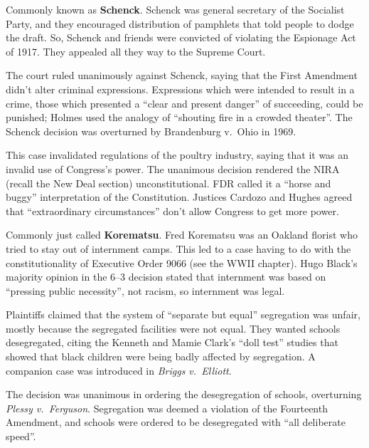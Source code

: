 Commonly known as \textbf{Schenck}.
Schenck was general secretary of the Socialist Party,
and they encouraged distribution of pamphlets that told people to dodge the draft.
So, Schenck and friends were convicted of violating the Espionage Act of 1917.
They appealed all they way to the Supreme Court.

The court ruled unanimously against Schenck, saying that the First Amendment didn't alter criminal expressions.
Expressions which were intended to result in a crime,
those which presented a ``clear and present danger'' of succeeding, could be punished;
Holmes used the analogy of ``shouting fire in a crowded theater''.
The Schenck decision was overturned by Brandenburg v.\ Ohio in 1969.


This case invalidated regulations of the poultry industry, saying that it was an invalid use of Congress's power.
The unanimous decision rendered the NIRA (recall the New Deal section) unconstitutional.
FDR called it a ``horse and buggy'' interpretation of the Constitution.
Justices Cardozo and Hughes agreed that ``extraordinary circumstances'' don't allow Congress to get more power.


Commonly just called \textbf{Korematsu}.
Fred Korematsu was an Oakland florist who tried to stay out of internment camps.
This led to a case having to do with the constitutionality of Executive Order 9066 (see the WWII chapter).
Hugo Black's majority opinion in the 6--3 decision stated that internment was based
on ``pressing public necessity'', not racism, so internment was legal.


Plaintiffs claimed that the system of ``separate but equal'' segregation was unfair,
mostly because the segregated facilities were not equal.
They wanted schools desegregated,
citing the Kenneth and Mamie Clark's ``doll test'' studies
that showed that black children were being badly affected by segregation.
A companion case was introduced in \textit{Briggs v.\ Elliott}.

The decision was unanimous in ordering the desegregation of schools, overturning \textit{Plessy v.\ Ferguson}.
Segregation was deemed a violation of the Fourteenth Amendment,
and schools were ordered to be desegregated with ``all deliberate speed''.

